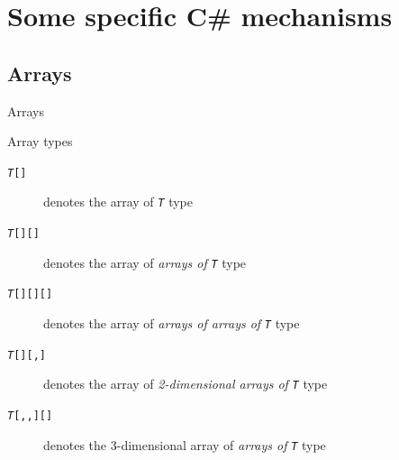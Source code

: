 \documentclass[presentation]{beamer}
\begin{document}
\section{Some specific C\# mechanisms}
\renewcommand{\codepath}[1]{../../code/lecture-02/#1}

\subsection{Arrays}

\begin{frame}{\dotnet Arrays}
    \begin{block}{Array types}
        \begin{description}
            \item[\texttt{\textit{T}\alert{[]}}] denotes the \alert{array of \texttt{\textit{T}}} type
            \item[\texttt{\textit{T}\alert{[][]}}] denotes the \alert{array of \emph{arrays of} \texttt{\textit{T}}} type
            \item[\texttt{\textit{T}\alert{[][][]}}] denotes the \alert{array of \emph{arrays of arrays of} \texttt{\textit{T}}} type
            \item[\texttt{\textit{T}\alert{[][,]}}] denotes the \alert{array of \emph{2-dimensional arrays of} \texttt{\textit{T}}} type
            \item[\texttt{\textit{T}\alert{[,,][]}}] denotes the \alert{3-dimensional array of \emph{arrays of} \texttt{\textit{T}}} type
        \end{description}
    \end{block}
\end{frame}
\end{document}
